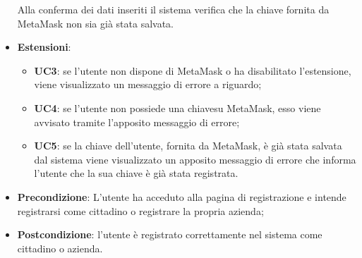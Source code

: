 \begin{itemize}
\begin{enumerate}[label=\alph*.]
	\end{enumerate}
Alla conferma dei dati inseriti il sistema verifica che la chiave\glosp 
fornita da MetaMask non sia già stata salvata.
	\item \textbf{Estensioni}: 
		\begin{itemize}
			\item\textbf{UC3}: se l'utente non dispone di MetaMask o ha disabilitato l'estensione, viene visualizzato un messaggio di errore a riguardo;
			\item\textbf{UC4}: se l'utente non possiede una chiave\glosp su MetaMask, esso viene avvisato tramite l'apposito messaggio di errore;
			\item\textbf{UC5}: se la chiave dell'utente, fornita da MetaMask, è già stata salvata dal sistema viene visualizzato un apposito messaggio di errore che informa l'utente che la sua chiave è già stata registrata.
		\end{itemize}
	\item \textbf{Precondizione}: L'utente ha acceduto alla pagina di registrazione e intende registrarsi come cittadino o registrare la propria azienda; 
	\item \textbf{Postcondizione}: l'utente è registrato correttamente nel sistema come cittadino o azienda.
	
\end{itemize}

